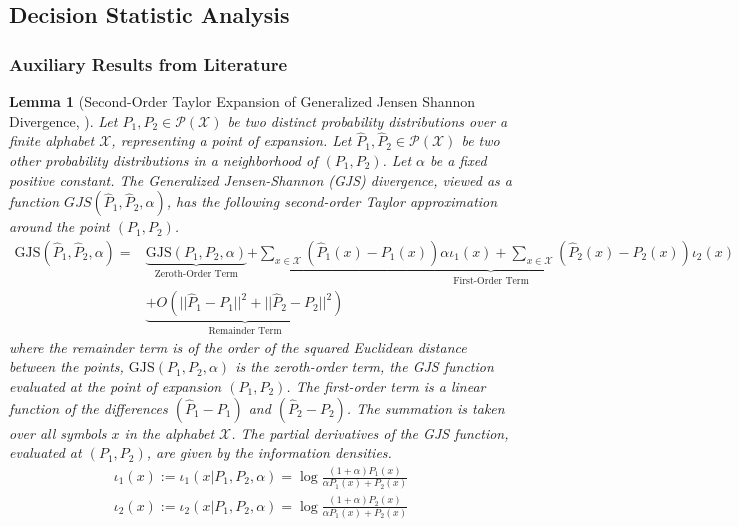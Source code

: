 \documentclass{article}
\theoremstyle{plain}
\newtheorem{lemma}[theorem]{Lemma}
\theoremstyle{definition}
\theoremstyle{remark}
\begin{document}
\subsection{Decision Statistic Analysis}
\subsubsection{Auxiliary Results from Literature}
\begin{lemma}[Second-Order Taylor Expansion of Generalized Jensen Shannon Divergence, \cite{zhou2018secondorderasymptoticallyoptimalstatistical}] \label{GJS-exp}
Let $P_1, P_2 \in \mathcal{P}(\mathcal{X})$ be two distinct probability distributions over a finite alphabet $\mathcal{X}$, representing a point of expansion. Let $\hat{P}_1, \hat{P}_2 \in \mathcal{P}(\mathcal{X})$ be two other probability distributions in a neighborhood of $(P_1, P_2)$. Let $\alpha$ be a fixed positive constant. The Generalized Jensen-Shannon (GJS) divergence, viewed as a function $GJS(\hat{P}_1, \hat{P}_2, \alpha)$, has the following second-order Taylor approximation around the point $(P_1, P_2)$.
\begin{align}
        \text{GJS}(\hat{P}_1, \hat{P}_2, \alpha) = & \underbrace{\text{GJS}(P_1, P_2, \alpha)}_{\text{Zeroth-Order Term}} 
    \underbrace{+ \sum_{x \in \mathcal{X}} (\hat{P}_1(x) - P_1(x))\alpha\iota_1(x) + \sum_{x \in \mathcal{X}} (\hat{P}_2(x) - P_2(x))\iota_2(x)}_{\text{First-Order Term}} \nonumber \\
    & \underbrace{+  O\left(||\hat{P}_1 - P_1||^2 + ||\hat{P}_2 - P_2||^2\right)}_{\text{Remainder Term}}
\end{align}
where the remainder term is of the order of the squared Euclidean distance between the points, $\text{GJS}(P_1, P_2, \alpha)$ is the zeroth-order term, the GJS function evaluated at the point of expansion $(P_1, P_2)$. The first-order term is a linear function of the differences $(\hat{P}_1 - P_1)$ and $(\hat{P}_2 - P_2)$. The summation is taken over all symbols $x$ in the alphabet $\mathcal{X}$. The partial derivatives of the GJS function, evaluated at $(P_1, P_2)$, are given by the information densities.
\begin{align}
    \iota_1(x) :=\iota_1(x|P_1, P_2, \alpha)= \log\frac{(1+\alpha)P_1(x)}{\alpha P_1(x) + P_2(x)}\\
        \iota_2(x) := \iota_2(x|P_1, P_2, \alpha) = \log\frac{(1+\alpha)P_2(x)}{\alpha P_1(x) + P_2(x)}
\end{align}
   
\end{lemma}
\end{document}
